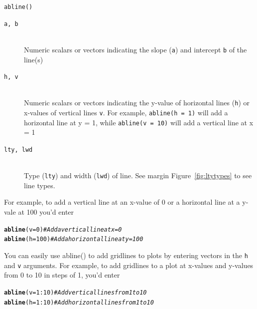 \documentclass{tufte-book}\usepackage[]{graphicx}\usepackage[]{color}
\makeatletter
\newcommand{\hlnum}[1]{\textcolor[rgb]{0.686,0.059,0.569}{#1}}%
\newcommand{\hlcom}[1]{\textcolor[rgb]{0.678,0.584,0.686}{\textit{#1}}}%
\newcommand{\hlopt}[1]{\textcolor[rgb]{0,0,0}{#1}}%
\newcommand{\hlstd}[1]{\textcolor[rgb]{0.345,0.345,0.345}{#1}}%
\newcommand{\hlkwc}[1]{\textcolor[rgb]{0.333,0.667,0.333}{#1}}%
\newcommand{\hlkwd}[1]{\textcolor[rgb]{0.737,0.353,0.396}{\textbf{#1}}}%
\newenvironment{kframe}{%
 \def\at@end@of@kframe{}%
 \ifinner\ifhmode%
  \def\at@end@of@kframe{\end{minipage}}%
  \begin{minipage}{\columnwidth}%
 \fi\fi%
 \def\FrameCommand##1{\hskip\@totalleftmargin \hskip-\fboxsep
 \colorbox{shadecolor}{##1}\hskip-\fboxsep
     \hskip-\linewidth \hskip-\@totalleftmargin \hskip\columnwidth}%
 \MakeFramed {\advance\hsize-\width
   \@totalleftmargin\z@ \linewidth\hsize
   \@setminipage}}%
 {\par\unskip\endMakeFramed%
 \at@end@of@kframe}
\newenvironment{knitrout}{}{} %
\newcommand{\newfun}[1]{\begin{LARGE} \begin{center} \texttt{#1} \end{center} \end{LARGE}}
\makeatother
\begin{document}
\begin{footnotesize}
{{\newfun{abline()}

\hline

\begin{description}

\item[\tt{a, b}] \hfill \\
Numeric scalars or vectors indicating the slope (\texttt{a}) and intercept {\texttt{b}} of the line(s)

\item[\tt{h, v}] \hfill \\
Numeric scalars or vectors indicating the y-value of horizontal lines (\texttt{h}) or x-values of vertical lines {\texttt{v}}. For example, \texttt{abline(h = 1)} will add a horizontal line at y = 1, while \texttt{abline(v = 10)} will add a vertical line at x = 1

\item[\tt{lty, lwd}] \hfill \\
Type (\texttt{lty}) and width (\texttt{lwd}) of line. See margin Figure~\ref{fig:ltytypes} to see line types.
  
\end{description}

}
}
\vspace{5mm} %


For example, to add a vertical line at an x-value of 0 or a horizontal line at a y-vale at 100 you'd enter

\begin{knitrout}
\color{fgcolor}\begin{kframe}
\begin{alltt}
\hlkwd{abline}\hlstd{(}\hlkwc{v} \hlstd{=} \hlnum{0}\hlstd{)} \hlcom{# Add a vertical line at x = 0}
\hlkwd{abline}\hlstd{(}\hlkwc{h} \hlstd{=} \hlnum{100}\hlstd{)} \hlcom{# Add a horizontal line at y = 100}
\end{alltt}
\end{kframe}
\end{knitrout}

You can easily use abline() to add gridlines to plots by entering vectors in the \texttt{h} and \texttt{v} arguments. For example, to add gridlines to a plot at x-values and y-values from 0 to 10 in steps of 1, you'd enter

\begin{knitrout}
\color{fgcolor}\begin{kframe}
\begin{alltt}
\hlkwd{abline}\hlstd{(}\hlkwc{v} \hlstd{=} \hlnum{1}\hlopt{:}\hlnum{10}\hlstd{)} \hlcom{# Add vertical lines from 1 to 10}
\hlkwd{abline}\hlstd{(}\hlkwc{h} \hlstd{=} \hlnum{1}\hlopt{:}\hlnum{10}\hlstd{)} \hlcom{# Add horizontal lines from 1 to 10}
\end{alltt}
\end{kframe}
\end{knitrout}


\end{footnotesize}
\end{document}
